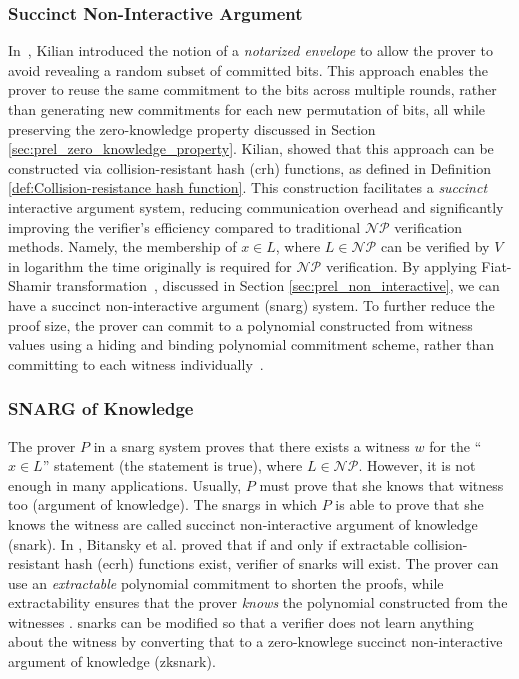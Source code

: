 \subsubsection{Succinct Non-Interactive Argument}
In~\cite{Kilian1992}, Kilian introduced the notion of a \textit{notarized envelope} to allow the prover to avoid revealing a random subset of committed bits. This approach enables the prover to reuse the same commitment to the bits across multiple rounds, rather than generating new commitments for each new permutation of bits, all while preserving the zero-knowledge property discussed in Section \ref{sec:prel_zero_knowledge_property}. Kilian, showed that this approach can be constructed via  collision-resistant hash (\gls{crh}) functions, as defined in Definition \ref{def:Collision-resistance hash function}. This construction facilitates a \textit{succinct} interactive argument system, reducing communication overhead and significantly improving the verifier's efficiency compared to traditional $\mathcal{NP}$ verification methods. Namely, the membership of $x \in L$, where $L \in \mathcal{NP}$ can be verified by $V$ in logarithm the time originally is required for  $\mathcal{NP}$ verification. By applying Fiat-Shamir transformation~\cite{Fiat1987}, discussed in Section \ref{sec:prel_non_interactive},  we can have a succinct non-interactive argument (\gls{snarg}) system. To further reduce the proof size, the prover can commit to a polynomial constructed from witness values using a hiding and binding polynomial commitment scheme, rather than committing to each witness individually~\cite{Thaler2022Proofs}.

\subsubsection{SNARG of Knowledge} 
The prover $P$ in a \gls{snarg} system proves that there exists a witness $w$ for the  ``$x \in L$''  statement (the statement is true), where $L\in \mathcal{NP}$. However, it is not enough in many applications. Usually, $P$ must prove that she knows that witness too (argument of knowledge).  The \gls{snarg}s in which $P$ is able to prove that she knows the witness are called succinct non-interactive argument of knowledge (\gls{snark}). In \cite{Bitansky2012}, Bitansky et al. proved that if and only if  extractable collision-resistant hash (\gls{ecrh}) functions exist, verifier of \gls{snark}s will exist.  The prover can use an \textit{extractable} polynomial commitment to shorten the proofs, while extractability ensures that the prover \textit{knows} the polynomial constructed from the witnesses \cite{Thaler2022Proofs}. \gls{snark}s can be modified so that a verifier does not learn anything about the witness by converting that to a zero-knowlege succinct non-interactive argument of knowledge (\gls{zksnark}).  

